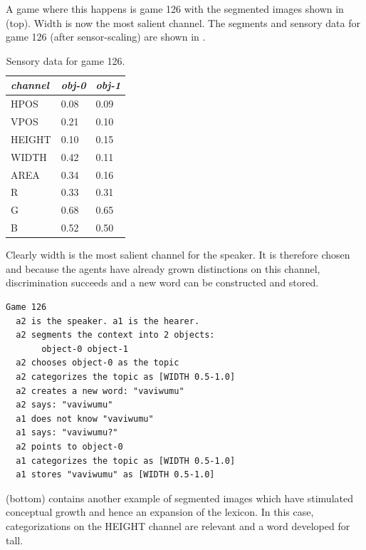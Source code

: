 A game where this happens is game 126 with the segmented images
shown in  (top). Width is now the most salient
channel. The segments and sensory data for game 126 
(after sensor-scaling) are shown in . 
\begin{table}
\begin{center}
\begin{tabular}{| l | l | l |} \hline
{\it channel}& {\it obj-0} & {\it obj-1}\\ \hline
HPOS & 0.08 & 0.09\\ \hline
VPOS & 0.21 & 0.10\\ \hline
HEIGHT & 0.10 & 0.15\\ \hline
WIDTH & 0.42 & 0.11\\ \hline
AREA & 0.34 & 0.16\\ \hline
R & 0.33 & 0.31\\ \hline
G & 0.68 & 0.65\\ \hline
B & 0.52 & 0.50\\ \hline
\end{tabular}
\caption{ \label{tab:game126} Sensory data for game 126.}
\end{center}
\end{table}
Clearly width is the most salient channel for the speaker. 
It is therefore chosen and because the 
agents have already grown distinctions on this channel, 
discrimination succeeds and a new word can be
constructed and stored. 
\begin{verbatim}
Game 126 
  a2 is the speaker. a1 is the hearer. 
  a2 segments the context into 2 objects: 
       object-0 object-1
  a2 chooses object-0 as the topic 
  a2 categorizes the topic as [WIDTH 0.5-1.0]
  a2 creates a new word: "vaviwumu"
  a2 says: "vaviwumu"
  a1 does not know "vaviwumu"
  a1 says: "vaviwumu?"
  a2 points to object-0
  a1 categorizes the topic as [WIDTH 0.5-1.0]
  a1 stores "vaviwumu" as [WIDTH 0.5-1.0]
\end{verbatim}
 (bottom) contains another example
of segmented images which have stimulated conceptual
growth and hence an expansion of the lexicon. 
In this case, categorizations on the HEIGHT channel are
relevant and a word developed for tall.
